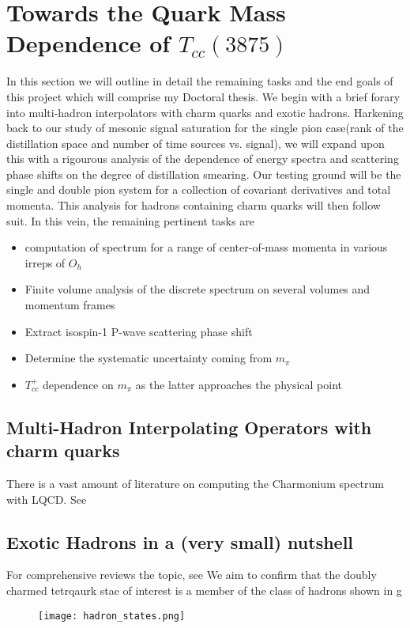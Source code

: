 
\chapter{Towards the Quark Mass Dependence of $T_{cc}(3875)$}
\label{sec:tcc}

In this section we will outline in detail the remaining tasks and the end goals of this project which will comprise my Doctoral thesis. We begin with a brief forary into multi-hadron interpolators with charm quarks and exotic hadrons. Harkening back to our study of mesonic signal saturation for the single pion case(rank of the distillation space and number of time sources vs. signal), we will expand upon this with a rigourous analysis of the dependence of energy spectra and scattering phase shifts on the degree of distillation smearing. Our testing ground will be the single and double pion system for a collection of covariant derivatives and total momenta. This analysis for hadrons containing charm quarks will then follow suit. In this vein, the remaining pertinent tasks are 
\begin{itemize}
    \item computation of spectrum for a range of center-of-mass momenta in various irreps of $O_h$
    \item Finite volume analysis of the discrete spectrum on several volumes and momentum frames
    \item Extract isospin-1 P-wave scattering phase shift 
    \item Determine the systematic uncertainty coming from $m_\pi$ 
    \item $T_{cc}^+$ dependence on $m_\pi$ as the latter approaches the physical point
\end{itemize}


\section{Multi-Hadron Interpolating Operators with charm quarks}
There is a vast amount of literature on computing the Charmonium spectrum with LQCD. See 


\section{Exotic Hadrons in a (very small) nutshell}
For comprehensive reviews the topic, see \cite{Chen}\cite{Guo:2017jvc} \cite{Brambilla:2019esw}We aim to confirm that the doubly charmed tetrqaurk stae of interest is a member of the class of hadrons shown in g
\begin{figure}
    \texttt{[image: hadron\_states.png]}
\end{figure}

